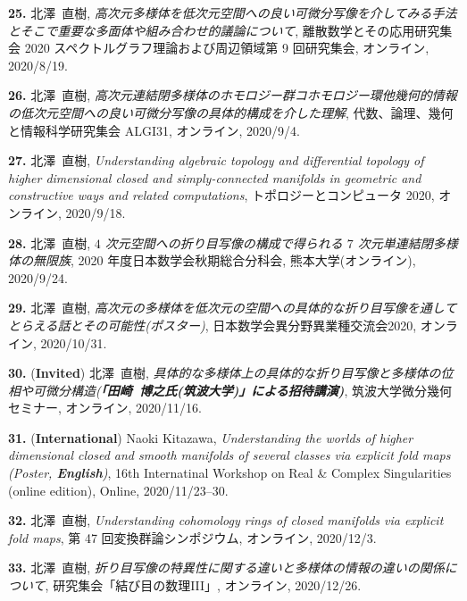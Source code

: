 \documentclass{article}
\begin{document}
\par\noindent
{\bf 25.} 北澤\ 直樹, \textsl{高次元多様体を低次元空間への良い可微分写像を介してみる手法とそこで重要な多面体や組み合わせ的議論について}, 離散数学とその応用研究集会 2020 スペクトルグラフ理論および周辺領域第 9 回研究集会, オンライン,  2020/8/19.

\par\noindent
{\bf 26.} 北澤\ 直樹, \textsl{高次元連結閉多様体のホモロジー群コホモロジー環他幾何的情報の低次元空間への良い可微分写像の具体的構成を介した理解}, 代数、論理、幾何と情報科学研究集会 ALGI31, オンライン, 2020/9/4.


\par\noindent
{\bf 27.} 北澤\ 直樹, \textsl{Understanding algebraic topology and differential topology of higher dimensional closed and simply-connected manifolds in  geometric and constructive ways and related computations}, トポロジーとコンピュータ 2020, オンライン,  2020/9/18.

\par\noindent
{\bf 28.} 北澤\ 直樹, \textsl{$4$ 次元空間への折り目写像の構成で得られる $7$ 次元単連結閉多様体の無限族}, 2020 年度日本数学会秋期総合分科会, 熊本大学(オンライン),  2020/9/24.

\par\noindent
{\bf 29.} 北澤\ 直樹, \textsl{高次元の多様体を低次元の空間への具体的な折り目写像を通してとらえる話とその可能性{\rm (}ポスター{\rm )}}, 日本数学会異分野異業種交流会2020, オンライン,  2020/10/31.

\par\noindent
{\bf 30.} ({\bf  Invited})  北澤\ 直樹, \textsl{具体的な多様体上の具体的な折り目写像と多様体の位相や可微分構造{\rm (}{\bf 「田崎\ 博之\quad  氏{\rm (}筑波大学{\rm )}」による招待講演{\rm )}}}, 筑波大学微分幾何セミナー, オンライン, 2020/11/16.

\par\noindent
{\bf 31.} ({\bf International}) Naoki Kitazawa, \textsl{Understanding the worlds of higher dimensional closed and smooth manifolds of several classes via explicit fold maps {\rm (}Poster, {\bf English}{\rm )}}, 16th Internatinal Workshop on Real \& Complex Singularities {\rm (}online edition{\rm )}, Online, 2020/11/23--30.

\par\noindent
{\bf 32.}  北澤\ 直樹, \textsl{Understanding cohomology rings of closed manifolds via explicit fold maps}, 第 47 回変換群論シンポジウム, オンライン, 2020/12/3.

\par\noindent
{\bf 33.}  北澤\ 直樹, \textsl{折り目写像の特異性に関する違いと多様体の情報の違いの関係について}, 研究集会「結び目の数理III」, オンライン, 2020/12/26.
\end{document}

